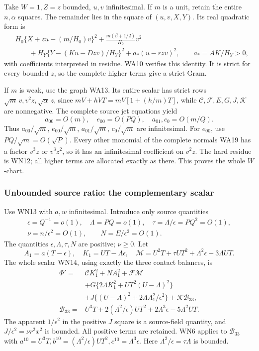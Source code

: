 Take \(W=1,Z=z\) bounded, \(u,v\) infinitesimal. If \(m\) is a
unit, retain the entire \(n,\alpha\) squares. The remainder lies
in the square of \((u,v,X,Y)\). Its real quadratic form is
\[
\begin{split}
 &H_0\{X+zu-(m/H_0)v\}^2+
       \frac{m(\beta+1/2)}{H_0}v^2\\
 &\qquad+H_Y\{Y-(Ku-Dzv)/H_Y\}^2
       +a_*(u-rzv)^2,\qquad a_*=AK/H_Y>0,
\end{split}\tag{WN19}
\]
with coefficients interpreted in residue. WA10 verifies this
identity. It is strict for every bounded \(z\), so the complete
higher terms give a strict Gram.

If \(m\) is weak, use the graph WA13. Its entire scalar has strict
rows \(\sqrt m\,v,v^2z,\sqrt\alpha\,z\), since
\(mV+hVT=mV[1+(h/m)T]\), while \(\mathcal C,\mathcal F,E,G,J,\mathcal K\)
are nonnegative. The complete source jet equations yield
\[
 a_{00}=O(m),\quad e_{00}=O(PQ),\quad
 a_{01},c_0=O(m/Q).
 \tag{WN20}
\]
Thus \(a_{00}/\sqrt m\), \(e_{00}/\sqrt m\),
\(a_{01}/\sqrt m\), \(c_0/\sqrt m\) are infinitesimal.
For \(e_{00}\), use \(PQ/\sqrt m=O(\sqrt P)\).
Every other monomial of the complete normals WA19 has a factor
\(v^3z\) or \(v^3z^2\), so it has an infinitesimal coefficient
on \(v^2z\). The hard residue is WN12; all higher terms are
allocated exactly as there. This proves the whole \(W\)-chart.

\subsubsection*{Unbounded source ratio: the complementary scalar}

Use WN13 with \(a,w\) infinitesimal. Introduce only source quantities
\[
\begin{gathered}
 \epsilon=Q^{-1}=o(1),\quad \Lambda=PQ=o(1),\quad
 \tau=\Lambda/\epsilon=PQ^2=O(1),\\
 \nu=n/\epsilon^2=O(1),\qquad N=E/\epsilon^2=O(1).
\end{gathered}\tag{WN21}
\]
The quantities \(\epsilon,\Lambda,\tau,N\) are positive; \(\nu\geq0\).
Let
\[
 A_1=a(T-\epsilon),\quad K_1=UT-\Lambda\epsilon,\quad
 \mathcal M=U^2T+\tau UT^2+\Lambda^2\epsilon-3\Lambda UT .
 \tag{WN22}
\]
The whole scalar WN14, using exactly the three contact balances, is
\[
\begin{split}
 \Phi'={}&\mathcal C K_1^2+NA_1^2+\mathcal F\mathcal M\\
 &+G\{2\Lambda K_1^2+UT^2(U-\Lambda)^2\}\\
 &+J\{(U-\Lambda)^2+2\Lambda A_1^2/\epsilon^2\}
       +\mathcal K\mathcal B_{33},\\
 \mathcal B_{33}={}&U^3T+2(\Lambda^2/\epsilon)UT^2
                      +2\Lambda^3\epsilon-5\Lambda^2UT .
\end{split}\tag{WN23}
\]
The apparent \(1/\epsilon^2\) in the positive \(J\) square is
a source-field quantity, and \(J/\epsilon^2=\nu r^2x^2\) is bounded.
All positive terms are retained. WN6 applies to \(\mathcal B_{33}\)
with \(a^{10}=U^3T,b^{10}=(\Lambda^2/\epsilon)UT^2,
c^{10}=\Lambda^3\epsilon\).
Here \(\Lambda^2/\epsilon=\tau\Lambda\) is bounded.

